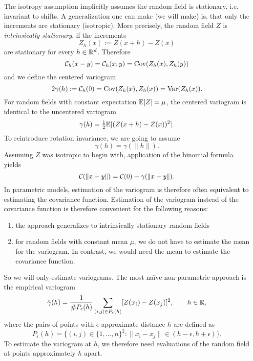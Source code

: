 The isotropy assumption implicitly assumes the random field is stationary,
i.e. invariant to shifts. A generalization one can make (we will make)
is, that only the increments are stationary (isotropic). More precisely, the
random field \(Z\) is \emph{intrinsically stationary}, if the increments
\[
	Z_h(x) := Z(x+h) - Z(x)
\]
are stationary for every \(h\in\mathbb{R}^d\). Therefore
\[
	\mathcal{C}_h(x-y) = \mathcal{C}_h(x,y) = \operatorname{Cov}(Z_h(x), Z_h(y))
\]
and we define the centered variogram
\[
	2\gamma(h):= \mathcal{C}_h(0) = \operatorname{Cov}(Z_h(x), Z_h(x))= \operatorname{Var}(Z_h(x)).
\]
For random fields with constant expectation \(\mathbb{E}[Z]=\mu\), the centered
variogram is identical to the uncentered variogram
\[
	\gamma(h) = \tfrac12\mathbb{E}[(Z(x+h)-Z(x))^2].
\]
To reintroduce rotation invariance, we are going to assume
\[
	\gamma(h)=\gamma(\|h\|).
\]
Assuming \(Z\) was isotropic to begin with, application of the binomial formula
yields
\[
	\mathcal{C}(\|x-y\|) = \mathcal{C}(0) - \gamma(\|x-y\|).
\]
In parametric models, estimation of the variogram is therefore often equivalent
to estimating the covariance function. Estimation of the variogram instead of
the covariance function is therefore convenient for the following reasons:
\begin{enumerate}
	\item the approach generalizes to intrinsically stationary random fields
	\item for random fields with constant mean \(\mu\), we do not have to
	estimate the mean for the variogram. In contrast, we would need the mean
	to estimate the covariance function.
\end{enumerate}
So we will only estimate variograms. The most naïve non-parametric approach
is the empirical variogram
\[
	\hat{\gamma}(h)
	= \frac{1}{\# P_\epsilon(h)}\sum_{(i,j)\in P_\epsilon(h)} [Z(x_i)-Z(x_j)]^2,
	\qquad h\in\mathbb{R},
\]
where the pairs of points with \(\epsilon\)-approximate distance \(h\) are
defined as
\[
	P_\epsilon(h)
	= \bigl\{
		(i,j)\in \{1,\dots,n\}^2 : \|x_i - x_j\| \in (h-\epsilon, h+\epsilon)
	\bigr\}.
\]
To estimate the variogram at \(h\), we therefore need evaluations of the random
field at points approximately \(h\) apart.
